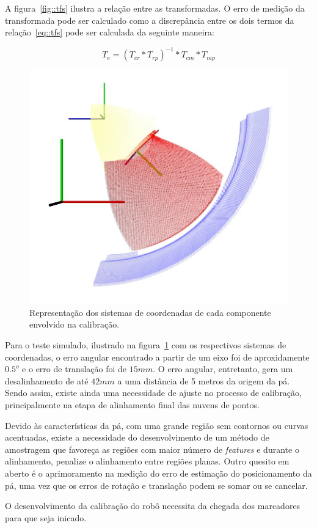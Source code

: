 A figura~\ref{fig::tfs} ilustra a relação entre as transformadas. O erro de
medição da transformada pode ser calculado como a discrepância entre os dois
termos da relação~\ref{eq::tfs} pode ser calculada da seguinte maneira:

$$T_e = (T_{cr}*T_{rp})^{-1}*T_{cm}*T_{mp}$$

\begin{figure}[h!]
	\centering
	\includegraphics[width=0.9\columnwidth]{figs/calibracao/tf_error}
	\caption{Representação dos sistemas de coordenadas de cada componente
	envolvido na calibração.}
    \label{fig::tf_error}
\end{figure}	

Para o teste simulado, ilustrado na figura~\ref{fig::tf_error} com os
respectivos sistemas de coordenadas, o erro angular encontrado a partir de um
eixo foi de aproxidamente $0.5^o$ e o erro de translação foi de $15mm$. 
O erro angular, entretanto, gera um desalinhamento de até $42mm$ a uma distância
de 5 metros da origem da pá. Sendo assim, existe ainda uma necessidade de ajuste
no processo de calibração, principalmente na etapa de alinhamento final das
nuvens de pontos.

Devido às características da pá, com uma grande região sem contornos ou curvas
acentuadas, existe a necessidade do desenvolvimento de um método de amostragem
que favoreça as regiões com maior número de \textit{features} e durante o
alinhamento, penalize o alinhamento entre regiões planas. Outro quesito em
aberto é o aprimoramento na medição do erro de estimação do posicionamento da
pá, uma vez que os erros de rotação e translação podem se somar ou se cancelar.

O desenvolvimento da calibração do robô necessita da chegada dos marcadores para
que seja inicado.

